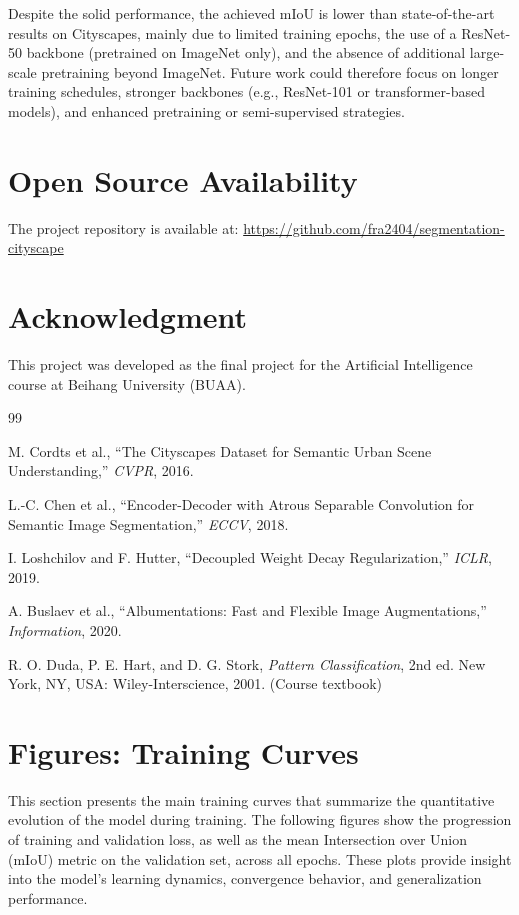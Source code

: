\documentclass[conference]{IEEEtran}
\begin{document}
Despite the solid performance, the achieved mIoU is lower than state-of-the-art results on Cityscapes, mainly due to limited training epochs, the use of a ResNet-50 backbone (pretrained on ImageNet only), and the absence of additional large-scale pretraining beyond ImageNet. Future work could therefore focus on longer training schedules, stronger backbones (e.g., ResNet-101 or transformer-based models), and enhanced pretraining or semi-supervised strategies.

\section{Open Source Availability}
\label{sec:open_source}
The project repository is available at: \url{https://github.com/fra2404/segmentation-cityscape}

\section*{Acknowledgment}
This project was developed as the final project for the Artificial Intelligence course at Beihang University (BUAA).

\begin{thebibliography}{99}

M. Cordts et al., ``The Cityscapes Dataset for Semantic Urban Scene Understanding,'' \emph{CVPR}, 2016.

L.-C. Chen et al., ``Encoder-Decoder with Atrous Separable Convolution for Semantic Image Segmentation,'' \emph{ECCV}, 2018.

I. Loshchilov and F. Hutter, ``Decoupled Weight Decay Regularization,'' \emph{ICLR}, 2019.

A. Buslaev et al., ``Albumentations: Fast and Flexible Image Augmentations,'' \emph{Information}, 2020.

R. O. Duda, P. E. Hart, and D. G. Stork, \emph{Pattern Classification}, 2nd ed. New York, NY, USA: Wiley-Interscience, 2001. (Course textbook)

\end{thebibliography}

\clearpage
\onecolumn
\appendix

\section{Figures: Training Curves}
\label{sec:appendix_curves}
This section presents the main training curves that summarize the quantitative evolution of the model during training. The following figures show the progression of training and validation loss, as well as the mean Intersection over Union (mIoU) metric on the validation set, across all epochs. These plots provide insight into the model's learning dynamics, convergence behavior, and generalization performance. 
\end{document}
